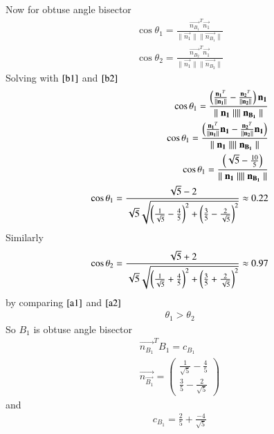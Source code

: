 \documentclass[journal]{IEEEtran}
\begin{document}
Now for obtuse angle bisector
\begin{align}
    \cos\theta_1=\frac{\vec{n_{B_1}}^T\vec{n_1}}{\parallel\vec{n_1}\parallel\parallel\vec{n_{B_1}}\parallel}\\
    \cos\theta_2=\frac{\vec{n_{B_2}}^T\vec{n_1}}{\parallel\vec{n_1}\parallel\parallel\vec{n_{B_2}}\parallel}
\end{align}
Solving with $\eqref{b1}$ and $\eqref{b2}$
\begin{align}
    \cos\theta_1=\frac{\left(\frac{\mathbf{n_1}^T}{\parallel\mathbf{n_1}\parallel} - \frac{\mathbf{n_2}^T}{\parallel\mathbf{n_2}\parallel}\right)\mathbf{n_1}}{\parallel\mathbf{n_1}\parallel\parallel\mathbf{n_{B_1}}\parallel}\\
    \cos\theta_1=\frac{\left(\frac{\mathbf{n_1}^T}{\parallel\mathbf{n_1}\parallel}\mathbf{n_1} - \frac{\mathbf{n_2}^T}{\parallel\mathbf{n_2}\parallel}\mathbf{n_1}\right)}{\parallel\mathbf{n_1}\parallel\parallel\mathbf{n_{B_1}}\parallel}\\
    \cos\theta_1=\frac{\left(\sqrt{5} - \frac{10}{5}\right)}{\parallel\mathbf{n_1}\parallel\parallel\mathbf{n_{B_1}}\parallel}\\
    \cos\theta_1=\frac{\sqrt{5}-2}{\sqrt{5}\sqrt{\left(\frac{1}{\sqrt{5}}-\frac{4}{5}\right)^2+\left(\frac{3}{5}-\frac{2}{\sqrt{5}}\right)^2}}\approx 0.22 \label{a1}
\end{align}
Similarly
\begin{align}
    \cos\theta_2=\frac{\sqrt{5}+2}{\sqrt{5}\sqrt{\left(\frac{1}{\sqrt{5}}+\frac{4}{5}\right)^2+\left(\frac{3}{5}+\frac{2}{\sqrt{5}}\right)^2}}\approx 0.97\label{a2}
\end{align}
by comparing $\eqref{a1}$ and $\eqref{a2}$
\begin{align}
    \theta_1>\theta_2
\end{align}
So $B_1$ is obtuse angle bisector
\begin{align}
\vec{n_{B_1}}^TB_1=c_{B_1}\\
\vec{n_{\vec{B_1}}}= \begin{pmatrix}\frac{1}{\sqrt{5}}-\frac{4}{5}\\ \frac{3}{5}-\frac{2}{\sqrt{5}} \end{pmatrix}
\end{align}
and
\begin{align}
    c_{B_1}=\frac{2}{5}+\frac{-4}{\sqrt{5}}
\end{align}
\end{document}
